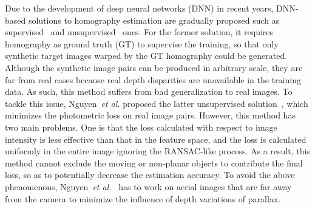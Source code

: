 \documentclass[runningheads]{llncs}
\begin{document}
Due to the development of deep neural networks (DNN) in recent years, DNN-based solutions to homography estimation are gradually proposed such as supervised~\cite{detone2016deep} and unsupervised~\cite{nguyen2018unsupervised} ones. For the former solution, it requires homography as ground truth (GT) to supervise the training, so that only synthetic target images warped by the GT homography could be generated. Although the synthetic image pairs can be produced in arbitrary scale, they are far from real cases because real depth disparities are unavailable in the training data. As such, this method suffers from bad generalization to real images. To tackle this issue, Nguyen~\emph{et al.} proposed the latter unsupervised solution~\cite{nguyen2018unsupervised}, which minimizes the photometric loss on real image pairs. However, this method has two main problems. One is that the loss calculated with respect to image intensity is less effective than that in the feature space, and the loss is calculated uniformly in the entire image ignoring the RANSAC-like process. As a result, this method cannot exclude the moving or non-planar objects to contribute the final loss, so as to potentially decrease the estimation accuracy. To avoid the above phenomenons, Nguyen~\emph{et al.}~\cite{nguyen2018unsupervised} has to work on aerial images that are far away from the camera to minimize the influence of depth variations of parallax.
\end{document}
